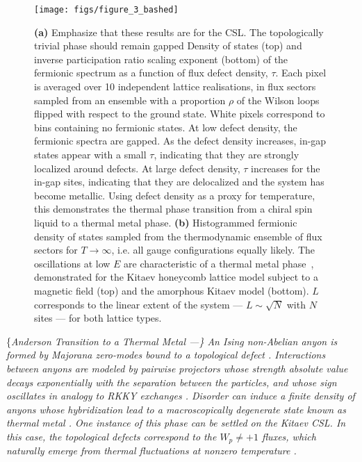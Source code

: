 \begin{figure}
    \centering
    \texttt{[image: figs/figure\_3\_bashed]}
    \caption{\textbf{(a)} {\color{red} Emphasize that these results are for the CSL. The topologically trivial phase should remain gapped} Density of states (top) and inverse participation ratio scaling exponent (bottom) of the fermionic spectrum as a function of flux defect density, $\tau$. Each pixel is averaged over 10 independent lattice realisations, in flux sectors sampled from an ensemble with a proportion $\rho$ of the Wilson loops flipped with respect to the ground state. White pixels correspond to bins containing no fermionic states. At low defect density, the fermionic spectra are gapped. As the defect density increases, in-gap states appear with a small $\tau$, indicating that they are strongly localized around defects. At large defect density, $\tau$ increases for the in-gap sites, indicating that they are delocalized and the system has become metallic. Using defect density as a proxy for temperature, this demonstrates the thermal phase transition from a chiral spin liquid to a thermal metal phase. \textbf{(b)} Histogrammed fermionic density of states sampled from the thermodynamic ensemble of flux sectors for $T\to\infty$, i.e. all gauge configurations equally likely. The oscillations at low $E$ are characteristic of a thermal metal phase~\cite{selfThermallyInducedMetallic2019}, demonstrated for the Kitaev honeycomb lattice model subject to a magnetic field (top) and the amorphous Kitaev model (bottom). $L$ corresponds to the linear extent of the system --- $L\sim\sqrt{N}$ with $N$ sites --- for both lattice types.}
    \label{fig:DOS_Oscillations}
\end{figure}

\{\it Anderson Transition to a Thermal Metal ---\} An Ising non-Abelian
anyon is formed by Majorana zero-modes bound to a topological defect
\cite{Beenakker2013}. Interactions between anyons are modeled by
pairwise projectors whose strength absolute value decays exponentially
with the separation between the particles, and whose sign oscillates in
analogy to RKKY exchanges
\cite{Laumann2012,Lahtinen_2011,lahtinenTopologicalLiquidNucleation2012}.
Disorder can induce a finite density of anyons whose hybridization lead
to a macroscopically degenerate state known as \emph{thermal metal}
\cite{Laumann2012}. One instance of this phase can be settled on the
Kitaev CSL. In this case, the topological defects correspond to the
\(W_p \neq +1\) fluxes, which naturally emerge from thermal fluctuations
at nonzero temperature \cite{selfThermallyInducedMetallic2019}.


